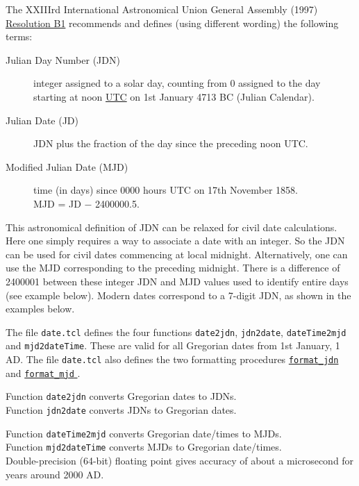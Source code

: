 The XXIIIrd International Astronomical Union General Assembly
      (1997) 
      \href{http://www.iers.org/iers/earth/resolutions/UAI-b1.html}{Resolution B1} recommends and defines (using different wording) the
      following terms:
      \begin{description}
        \item[Julian Day Number (JDN)]
        integer assigned to a solar day, counting from 0 assigned
        to the day starting at noon 
        \href{http://tycho.usno.navy.mil/systime.html}{UTC} on
        1st January 4713 BC (Julian Calendar).
        \item[Julian Date (JD)]
        JDN plus the fraction of the day since the preceding noon
        UTC.
        \item[Modified Julian Date (MJD)]
        time (in days) since 0000 hours UTC on 17th November 1858.
        \\MJD = JD $-$ 2400000.5.
      \end{description}
      

This astronomical definition of JDN can be relaxed for civil
      date calculations. Here one simply requires a way to associate a
      date with an integer. So the JDN can be used for civil dates
      commencing at local midnight. Alternatively, one can use the MJD
      corresponding to the preceding midnight. There is a difference of
      2400001 between these integer JDN and MJD values used to identify
      entire days (see example below). Modern dates correspond to a
      7-digit JDN, as shown in the examples below.
      

The file 
      \texttt{date.tcl} defines the four functions 
      \texttt{date2jdn}, 
      \texttt{jdn2date}, 
      \texttt{dateTime2mjd} and 
      \texttt{mjd2dateTime}. These are valid for all Gregorian
      dates from 1st January, 1 AD. The file 
      \texttt{date.tcl} also defines the two formatting procedures 
      \href{date-proc.html\#format-jdn}{ \texttt{format\_jdn} } and 
      \href{date-proc.html\#format-mjd}{ \texttt{format\_mjd} } .
      

Function 
      \texttt{date2jdn} converts Gregorian dates to JDNs.
      \\Function 
      \texttt{jdn2date} converts JDNs to Gregorian dates.
      

Function 
      \texttt{dateTime2mjd} converts Gregorian date/times to MJDs.
      \\Function 
      \texttt{mjd2dateTime} converts MJDs to Gregorian date/times.
      \\Double-precision (64-bit) floating point gives accuracy of
      about a microsecond for years around 2000 AD.
      


